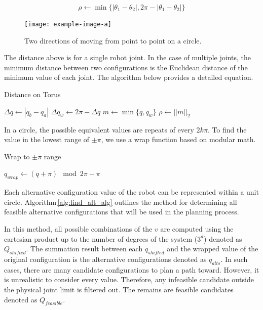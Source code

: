 \begin{equation}
    \rho \gets \min\{|\theta_1 - \theta_2|, 2\pi - |\theta_1 - \theta_2|\}
\end{equation}

\begin{figure}[!ht]
    \centering
    \texttt{[image: example-image-a]}
    \caption{Two directions of moving from point to point on a circle.}

\end{figure}

The distance above is for a single robot joint. In the case of multiple joints, the minimum distance between two configurations is the Euclidean distance of the minimum value of each joint. The algorithm below provides a detailed equation.

\begin{algorithm}[!h]
    \caption{Distance on Torus}

    \begin{algorithmic}
        \State $\Delta q \gets |q_b - q_a|$
        \State $\Delta q_w \gets 2\pi - \Delta q$
        \State $m \gets \min \{q, q_w\}$
        \State \Return $\rho \gets || m ||_2$
        \EndFunction
    \end{algorithmic}
\end{algorithm}

In a circle, the possible equivalent values are repeats of every $2k\pi$. To find the value in the lowest range of $\pm \pi$, we use a wrap function based on modular math.

\begin{algorithm}[!t]
    \caption{Wrap to $\pm \pi$ range}

    \begin{algorithmic}
        \State \Return $q_{wrap} \gets (q + \pi) \mod 2\pi - \pi$
        \EndFunction
    \end{algorithmic}
\end{algorithm}


Each alternative configuration value of the robot can be represented within a unit circle. Algorithm\,\ref{alg:find_alt_alg} outlines the method for determining all feasible alternative configurations that will be used in the planning process.

In this method, all possible combinations of the $v$ are computed using the cartesian product up to the number of degrees of the system ($3^d$) denoted as $Q_{shifted}$. The summation result between each $q_{shifted}$ and the wrapped value of the original configuration is the alternative configurations denoted as $q_{alts}$. In such cases, there are many candidate configurations to plan a path toward. However, it is unrealistic to consider every value. Therefore, any infeasible candidate outside the physical joint limit is filtered out. The remains are feasible candidates denoted as $Q_{feasible}$.


